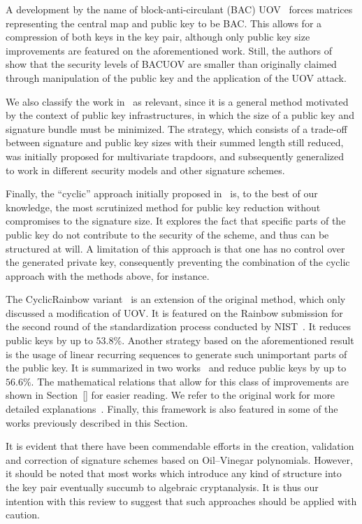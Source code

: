 \documentclass[draft, 12pt, a4paper, oneside]{memoir}
\begin{document}
A development by the name of block-anti-circulant (BAC) UOV~\cite{} forces matrices representing the central map and public key to be BAC. This allows for a compression of both keys in the key pair, although only public key size improvements are featured on the aforementioned work. Still, the authors of~\cite{} show that the security levels of BACUOV are smaller than originally claimed through manipulation of the public key and the application of the UOV attack.

We also classify the work in~\cite{} as relevant, since it is a general method motivated by the context of public key infrastructures, in which the size of a public key and signature bundle must be minimized. The strategy, which consists of a trade-off between signature and public key sizes with their summed length still reduced, was initially proposed for multivariate trapdoors, and subsequently generalized~\cite{} to work in different security models and other signature schemes.

Finally, the ``cyclic'' approach initially proposed in~\cite{} is, to the best of our knowledge, the most scrutinized method for public key reduction without compromises to the signature size. It explores the fact that specific parts of the public key do not contribute to the security of the scheme, and thus can be structured at will. A limitation of this approach is that one has no control over the generated private key, consequently preventing the combination of the cyclic approach with the methods above, for instance.

The CyclicRainbow variant~\cite{} is an extension of the original method, which only discussed a modification of UOV. It is featured on the Rainbow submission for the second round of the standardization process conducted by NIST~\cite{}. It reduces public keys by up to $53.8\%$. Another strategy based on the aforementioned result is the usage of linear recurring sequences to generate such unimportant parts of the public key. It is summarized in two works~\cite{} and reduce public keys by up to $56.6\%$. The mathematical relations that allow for this class of improvements are shown in Section~\ref{} for easier reading. We refer to the original work for more detailed explanations~\cite{}. Finally, this framework is also featured in some of the works previously described in this Section.

It is evident that there have been commendable efforts in the creation, validation and correction of signature schemes based on Oil--Vinegar polynomials. However, it should be noted that most works which introduce any kind of structure into the key pair eventually succumb to algebraic cryptanalysis. It is thus our intention with this review to suggest that such approaches should be applied with caution. 



\end{document}
